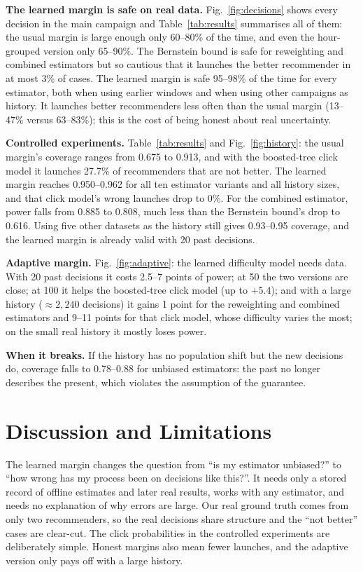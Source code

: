 \documentclass[conference]{IEEEtran}
\begin{document}
\textbf{The learned margin is safe on real data.} Fig.~\ref{fig:decisions} shows every decision in the main campaign and Table~\ref{tab:results} summarises all of them: the usual margin is large enough only 60--80\% of the time, and even the hour-grouped version only 65--90\%. The Bernstein bound is safe for reweighting and combined estimators but so cautious that it launches the better recommender in at most 3\% of cases. The learned margin is safe 95--98\% of the time for every estimator, both when using earlier windows and when using other campaigns as history. It launches better recommenders less often than the usual margin (13--47\% versus 63--83\%); this is the cost of being honest about real uncertainty.

\textbf{Controlled experiments.} Table~\ref{tab:results} and Fig.~\ref{fig:history}: the usual margin's coverage ranges from 0.675 to 0.913, and with the boosted-tree click model it launches 27.7\% of recommenders that are not better. The learned margin reaches 0.950--0.962 for all ten estimator variants and all history sizes, and that click model's wrong launches drop to 0\%. For the combined estimator, power falls from 0.885 to 0.808, much less than the Bernstein bound's drop to 0.616. Using five other datasets as the history still gives 0.93--0.95 coverage, and the learned margin is already valid with 20 past decisions.

\textbf{Adaptive margin.} Fig.~\ref{fig:adaptive}: the learned difficulty model needs data. With 20 past decisions it costs 2.5--7 points of power; at 50 the two versions are close; at 100 it helps the boosted-tree click model (up to $+5.4$); and with a large history ($\approx2{,}240$ decisions) it gains 1 point for the reweighting and combined estimators and 9--11 points for that click model, whose difficulty varies the most; on the small real history it mostly loses power.

\textbf{When it breaks.} If the history has no population shift but the new decisions do, coverage falls to 0.78--0.88 for unbiased estimators: the past no longer describes the present, which violates the assumption of the guarantee.

\section{Discussion and Limitations}
The learned margin changes the question from ``is my estimator unbiased?'' to ``how wrong has my process been on decisions like this?''. It needs only a stored record of offline estimates and later real results, works with any estimator, and needs no explanation of why errors are large. Our real ground truth comes from only two recommenders, so the real decisions share structure and the ``not better'' cases are clear-cut. The click probabilities in the controlled experiments are deliberately simple. Honest margins also mean fewer launches, and the adaptive version only pays off with a large history.
\end{document}
